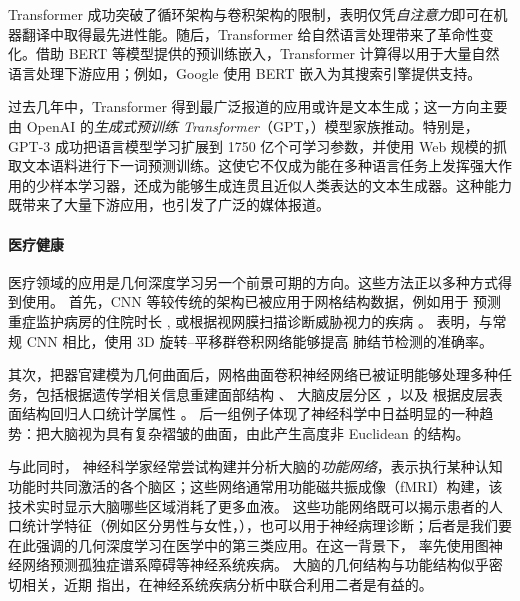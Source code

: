 Transformer \citep{vaswani2017attention} 成功突破了循环架构与卷积架构的限制，表明仅凭\emph{自注意力}即可在机器翻译中取得最先进性能。随后，Transformer 给自然语言处理带来了革命性变化。借助 BERT \citep{devlin2018bert} 等模型提供的预训练嵌入，Transformer 计算得以用于大量自然语言处理下游应用；例如，Google 使用 BERT 嵌入为其搜索引擎提供支持。

过去几年中，Transformer 得到最广泛报道的应用或许是文本生成；这一方向主要由 OpenAI 的\emph{生成式预训练 Transformer}（GPT，\cite{radford2018improving,radford2019language,brown2020language}）模型家族推动。特别是，GPT-3 \citep{brown2020language} 成功把语言模型学习扩展到 1750 亿个可学习参数，并使用 Web 规模的抓取文本语料进行下一词预测训练。这使它不仅成为能在多种语言任务上发挥强大作用的少样本学习器，还成为能够生成连贯且近似人类表达的文本生成器。这种能力既带来了大量下游应用，也引发了广泛的媒体报道。

\paragraph{医疗健康}
%
医疗领域的应用是几何深度学习另一个前景可期的方向。这些方法正以多种方式得到使用。
%
首先，CNN 等较传统的架构已被应用于网格结构数据，例如用于
预测重症监护病房的住院时长
\citep{rocheteau2020temporal}, 
或根据视网膜扫描诊断威胁视力的疾病 \citep{de2018clinically}。
%
\cite{winkels2019pulmonary} 表明，与常规 CNN 相比，使用 3D 旋转--平移群卷积网络能够提高
肺结节检测的准确率。


其次，把器官建模为几何曲面后，网格曲面卷积神经网络已被证明能够处理多种任务，包括根据遗传学相关信息重建面部结构 \citep{mahdi20203d}、
大脑皮层分区 \citep{cucurull2018convolutional}，以及
根据皮层表面结构回归人口统计学属性 \citep{besson2020geometric}。
%
%
后一组例子体现了神经科学中日益明显的一种趋势：把大脑视为具有复杂褶皱的曲面，由此产生高度非 Euclidean 的结构。


与此同时，
神经科学家经常尝试构建并分析大脑的\emph{功能网络}，表示执行某种认知功能时共同激活的各个脑区；这些网络通常用功能磁共振成像（fMRI）构建，该技术实时显示大脑哪些区域消耗了更多血液。
%
这些功能网络既可以揭示患者的人口统计学特征（例如区分男性与女性，\cite{arslan2018graph}），也可以用于神经病理诊断；后者是我们要在此强调的几何深度学习在医学中的第三类应用。在这一背景下，\cite{ktena2017distance} 率先使用图神经网络预测孤独症谱系障碍等神经系统疾病。
%
大脑的几何结构与功能结构似乎密切相关，近期 \cite{itani2021combining} 指出，在神经系统疾病分析中联合利用二者是有益的。



